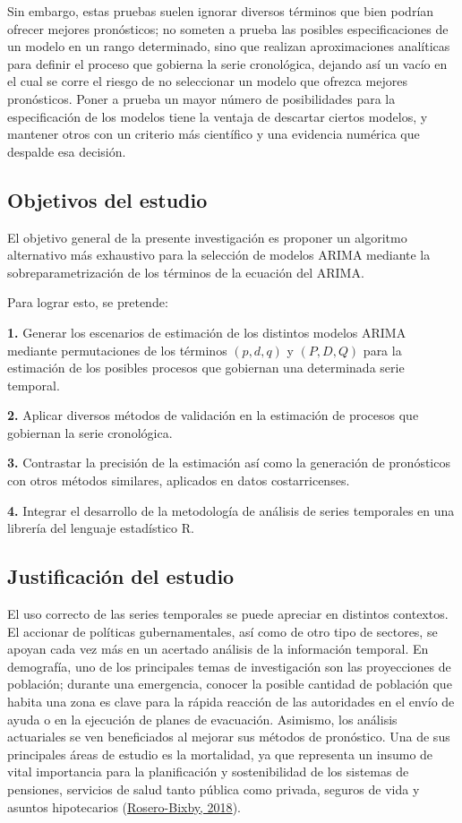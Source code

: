 \documentclass[
]{article}
\begin{document}
Sin embargo, estas pruebas suelen ignorar diversos términos que bien
podrían ofrecer mejores pronósticos; no someten a prueba las posibles
especificaciones de un modelo en un rango determinado, sino que realizan
aproximaciones analíticas para definir el proceso que gobierna la serie
cronológica, dejando así un vacío en el cual se corre el riesgo de no
seleccionar un modelo que ofrezca mejores pronósticos. Poner a prueba un
mayor número de posibilidades para la especificación de los modelos
tiene la ventaja de descartar ciertos modelos, y mantener otros con un
criterio más científico y una evidencia numérica que despalde esa
decisión.

\subsection{Objetivos del estudio}

El objetivo general de la presente investigación es proponer un
algoritmo alternativo más exhaustivo para la selección de modelos ARIMA
mediante la sobreparametrización de los términos de la ecuación del
ARIMA.

Para lograr esto, se pretende:

\textbf{1.} Generar los escenarios de estimación de los distintos
modelos ARIMA mediante permutaciones de los términos \((p,d,q)\) y
\((P,D,Q)\) para la estimación de los posibles procesos que gobiernan
una determinada serie temporal.

\textbf{2.} Aplicar diversos métodos de validación en la estimación de
procesos que gobiernan la serie cronológica.

\textbf{3.} Contrastar la precisión de la estimación así como la
generación de pronósticos con otros métodos similares, aplicados en
datos costarricenses.

\textbf{4.} Integrar el desarrollo de la metodología de análisis de
series temporales en una librería del lenguaje estadístico R.

\subsection{Justificación del estudio}

El uso correcto de las series temporales se puede apreciar en distintos
contextos. El accionar de políticas gubernamentales, así como de otro
tipo de sectores, se apoyan cada vez más en un acertado análisis de la
información temporal. En demografía, uno de los principales temas de
investigación son las proyecciones de población; durante una emergencia,
conocer la posible cantidad de población que habita una zona es clave
para la rápida reacción de las autoridades en el envío de ayuda o en la
ejecución de planes de evacuación. Asimismo, los análisis actuariales se
ven beneficiados al mejorar sus métodos de pronóstico. Una de sus
principales áreas de estudio es la mortalidad, ya que representa un
insumo de vital importancia para la planificación y sostenibilidad de
los sistemas de pensiones, servicios de salud tanto pública como
privada, seguros de vida y asuntos hipotecarios
(\protect\hyperlink{ref-supenprodc}{Rosero-Bixby, 2018}).
\end{document}
